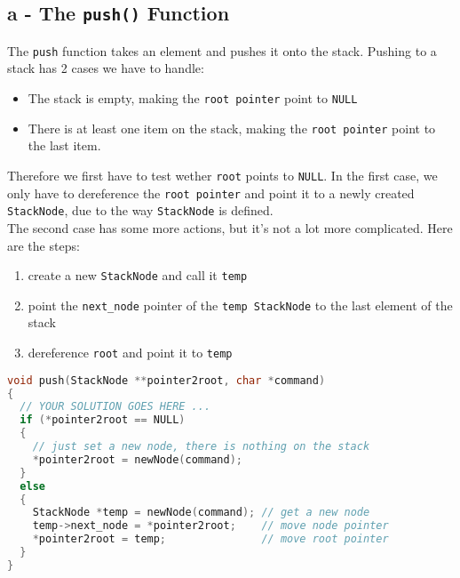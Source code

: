 \documentclass[a4paper, 11pt]{article}
\begin{document}
    \subsection{a - The \texttt{push()} Function}
    The \texttt{push} function takes an element and pushes it onto the stack.
    Pushing to a stack has 2 cases we have to handle:
    \begin{itemize}
        \item The stack is empty, making the \texttt{root pointer} point to \lstinline{NULL}
        \item There is at least one item on the stack, making the \texttt{root pointer} point to the last item.
    \end{itemize}
    Therefore we first have to test wether \texttt{root} points to \lstinline{NULL}. 
    In the first case, we only have to dereference the \texttt{root pointer} and point it to a newly created 
    \texttt{StackNode}, due to the way \texttt{StackNode} is defined.
    \\
    The second case has some more actions, but it's not a lot more complicated. Here are the steps:
    \begin{enumerate}
        \item create a new \texttt{StackNode} and call it \texttt{temp}
        \item point the \texttt{next\_node} pointer of the \texttt{temp StackNode} to the 
              last element of the stack
        \item dereference \texttt{root} and point it to \texttt{temp}
    \end{enumerate}
    \begin{lstlisting}[language=C,caption={The \texttt{push()} Function},label={push}]
void push(StackNode **pointer2root, char *command)
{
  // YOUR SOLUTION GOES HERE ...
  if (*pointer2root == NULL)
  {
    // just set a new node, there is nothing on the stack
    *pointer2root = newNode(command); 
  }
  else
  {
    StackNode *temp = newNode(command); // get a new node
    temp->next_node = *pointer2root;    // move node pointer
    *pointer2root = temp;               // move root pointer
  }
}
    \end{lstlisting}

\end{document}
